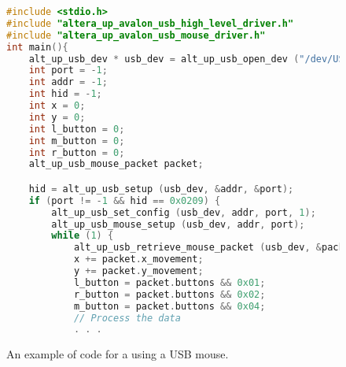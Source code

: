 \begin{figure}[h!]
\begin{center}
\begin{minipage}[t]{12.5 cm}
\begin{lstlisting}[language=C]
#include <stdio.h>
#include "altera_up_avalon_usb_high_level_driver.h"
#include "altera_up_avalon_usb_mouse_driver.h"
int main(){
	alt_up_usb_dev * usb_dev = alt_up_usb_open_dev ("/dev/USB/");
	int port = -1;
	int addr = -1;
	int hid = -1;
	int x = 0;
	int y = 0;
	int l_button = 0;
	int m_button = 0;
	int r_button = 0;
	alt_up_usb_mouse_packet packet;

	hid = alt_up_usb_setup (usb_dev, &addr, &port);
	if (port != -1 && hid == 0x0209) {
		alt_up_usb_set_config (usb_dev, addr, port, 1);
		alt_up_usb_mouse_setup (usb_dev, addr, port);
		while (1) {
			alt_up_usb_retrieve_mouse_packet (usb_dev, &packet);
			x += packet.x_movement;
			y += packet.y_movement;
			l_button = packet.buttons && 0x01;
			r_button = packet.buttons && 0x02;
			m_button = packet.buttons && 0x04;
			// Process the data
			. . .
\end{lstlisting}
\end{minipage}
\end{center}
	\vspace{-0.33in}\caption{An example of code for a using a USB mouse.}
   \label{fig:usb_mouse}
\end{figure}